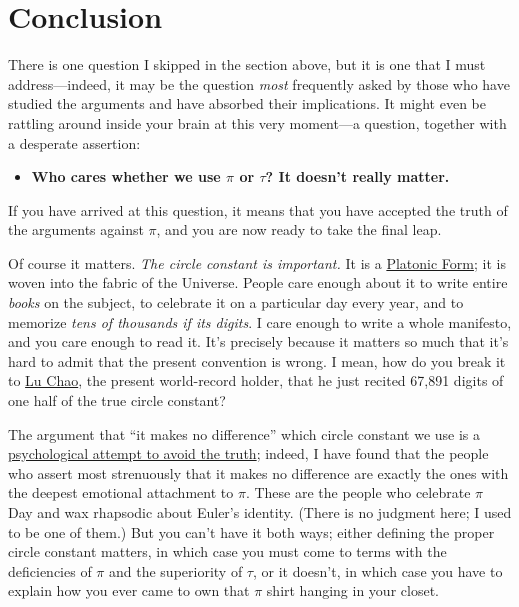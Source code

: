 \documentclass{article}
\begin{document}

\section{Conclusion}

There is one question I skipped in the section above, but it is one that I must address---indeed, it may be the question \emph{most} frequently asked by those who have studied the arguments and have absorbed their implications. It might even be rattling around inside your brain at this very moment---a question, together with a desperate assertion:

\begin{itemize}
  \item \textbf{Who cares whether we use $\pi$ or $\tau$? It doesn't really matter.}
\end{itemize}

\noindent If you have arrived at this question, it means that you have accepted the truth of the arguments against $\pi$, and you are now ready to take the final leap.

Of course it matters. \emph{The circle constant is important.} It is a \href{http://en.wikipedia.org/wiki/Theory_of_forms}{Platonic Form}; it is woven into the fabric of the Universe. People care enough about it to write entire \emph{books} on the subject, to celebrate it on a particular day every year, and to memorize \emph{tens of thousands if its digits}. I care enough to write a whole manifesto, and you care enough to read it. It's precisely because it matters so much that it's hard to admit that the present convention is wrong. I mean, how do you break it to \href{http://en.wikipedia.org/wiki/Lu_Chao}{Lu Chao}, the present world-record holder, that he just recited 67,891 digits of one half of the true circle constant? 

The argument that ``it makes no difference'' which circle constant we use is a \href{http://en.wikipedia.org/wiki/Denial}{psychological attempt to avoid the truth}; indeed, I have found that the people who assert most strenuously that it makes no difference are exactly the ones with the deepest emotional attachment to $\pi$. These are the people who celebrate $\pi$ Day and wax rhapsodic about Euler's identity. (There is no judgment here; I used to be one of them.) But you can't have it both ways; either defining the proper circle constant matters, in which case you must come to terms with the deficiencies of $\pi$ and the superiority of $\tau$, or it doesn't, in which case you have to explain how you ever came to own that $\pi$ shirt hanging in your closet.
\end{document}
